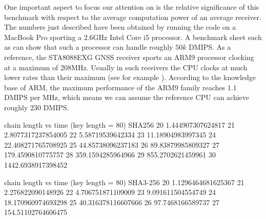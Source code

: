 
One important aspect to focus our attention on is the relative significance of
this benchmark with respect to the average computation power of an average
receiver. The numbers just described have been obtained by running the code on a
MacBook Pro sporting a 2.6GHz Intel Core i5 processor. A benchmark sheet such as
\cite{bm_intel_core_i5} can show that such a processor can handle roughly $50k$
DMIPS. As a reference, the STA8088EXG GNSS receiver \cite{st_rec_specs} sports
an ARM9 processor clocking at a maximum of 208MHz. Usually in such receivers the
CPU clocks at much lower rates than their maximum (see for example
\cite{mediatek_specs}). According to the knowledge base of ARM, the maximum
performance of the ARM9 family reaches $1.1$ DMIPS per MHz, which means we can
assume the reference CPU can achieve roughly $230$ DMIPS.


chain length vs time (key length = 80)
SHA256
20 1.444907307624817
21 2.8077317237854005
22 5.58719539642334
23 11.18904983997345
24 22.408271765708925
25 44.85738096237183
26 89.83879985809327
27 179.4590810775757
28 359.1594285964966
29 855.2702621459961
30 1442.6938917398452

chain length vs time (key length = 80)
SHA3-256
20 1.1296464681625367
21 2.276822090148926
22 4.706751871109009
23 9.091611504554749
24 18.170960974693298
25 40.316378116607666
26 97.7468166589737
27 154.51102764606475

